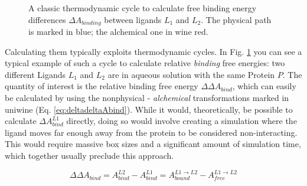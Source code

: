 \documentclass[oneside]{scrreprt}
\begin{document}
\begin{figure}[H]
   
    
    

  \begin{center}

    
    \caption[Thermodynamic cycle for RBFE differences]{A classic thermodynamic cycle to calculate free binding energy differences $\Delta A_{binding}$ between ligands $L_1$ and $L_2$. The physical path is marked in blue; the alchemical one in wine red.} 
    \label{fig:thermocycle_rbfe}
  \end{center}
\end{figure}

Calculating them typically exploits thermodynamic cycles. In Fig. \ref{fig:thermocycle_rbfe} you can see a typical example of such a cycle to calculate relative \emph{binding} free energies: two different Ligands $L_1$ and $L_2$ are in aqueous solution with the same Protein $P$. The quantity of interest is the relative binding free energy $\Delta \Delta A_{bind}$, which can easily be calculated by using the nonphysical - \emph{alchemical} transformations marked in uniwine (Eq. \ref{eq:deltadeltaAbind}). While it would, theoretically, be possible to calculate $\Delta A^{L1}_{bind}$ directly, doing so would involve creating a simulation where the ligand moves far enough away from the protein to be considered non-interacting. This would require massive box sizes and a significant amount of simulation time, which together usually preclude this approach.

\begin{equation}
    \Delta \Delta A_{bind} = A^{L2}_{bind}-A^{L1}_{bind}=A^{L1\rightarrow L2}_{bound}-A^{L1\rightarrow L2}_{free}
    \label{eq:deltadeltaAbind}
\end{equation}
\end{document}
